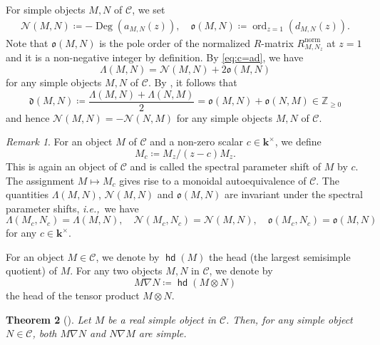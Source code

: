 \documentclass[12pt]{amsart}
\newtheorem{theorem}{Theorem}[section]
\theoremstyle{definition}
\theoremstyle{remark}
\newtheorem{remark}[theorem]{Remark}
\numberwithin{equation}{section}
\newcommand{\hd}{\opname{hd}}
\newcommand{\opname}[1]{\operatorname{\mathsf{#1}}}
\newcommand{\ie}{\textit{i.e.,}\ }
\begin{document}
For simple objects $M,N$ of $\mathscr{C}$, we set
\begin{eqnarray}\label{eqn:def-N}
    \mathscr{N}(M,N) \coloneqq -\mathop{\mathrm{Deg}}(a_{M,N}(z)), \quad 
\mathfrak{o}(M,N)\coloneqq \mathop{\mathrm{ord}}_{z=1}(d_{M,N}(z)).
\end{eqnarray}
Note that $\mathfrak{o}(M,N)$ is the pole order of the normalized $R$-matrix $R^{\mathrm{norm}}_{M,N_z}$ at $z=1$ and it is a non-negative integer by definition. By \eqref{eq:c=ad}, we have
\begin{equation} \label{eq:L=N+2o}
\Lambda(M,N) = \mathscr{N}(M,N) + 2 \mathfrak{o}(M,N)
\end{equation}
for any simple objects $M,N$ of $\mathscr{C}$. 
By \cite[Proposition 3.16]{kkop-2020}, it follows that
\[\mathfrak{d}(M,N) \coloneqq \frac{\Lambda(M,N) + \Lambda(N,M)}{2} = \mathfrak{o}(M,N)+\mathfrak{o}(N,M) \in \mathbb{Z}_{\ge 0}\]
and hence $\mathscr{N}(M,N) = - \mathscr{N}(N,M)$
for any simple objects $M,N$ of $\mathscr{C}$.

\begin{remark}\label{Rem:spec}
For an object $M$ of $\mathscr{C}$ and a non-zero scalar $c \in \mathbf{k}^\times$, we define 
\[ M_c \coloneqq M_z/(z-c)M_z.\]
This is again an object of $\mathscr{C}$ and is called the spectral parameter shift of $M$ by $c$.
The assignment $M \mapsto M_c$ gives rise to a monoidal autoequivalence of $\mathscr{C}$.
The quantities $\Lambda(M,N)$, $\mathscr{N}(M,N)$ and $\mathfrak{o}(M,N)$ are invariant under the spectral parameter shifts, \ie we have
\[ \Lambda(M_c,N_c) = \Lambda(M,N), \quad 
\mathscr{N}(M_c,N_c) = \mathscr{N}(M,N), \quad \mathfrak{o}(M_c,N_c) = \mathfrak{o}(M,N)\]
for any $c \in \mathbf{k}^\times$. 
\end{remark}




 For an object $M\in\mathscr{C}$, we denote by $\hd(M)$ the head (the largest semisimple quotient) of  $M$. For any two objects $M,N$ in $\mathscr{C}$, we denote by
\[M\nabla N \coloneqq  \hd(M\otimes N)
\]
 the head of the tensor product $M\otimes N$.
\begin{theorem}[{\cite{KKKO-2015}}]
\label{thm:kkko-15}
Let $M$ be a real simple object in $\mathscr{C}$. Then, for any simple object $N \in \mathscr{C}$, both $M \nabla N$ and $N \nabla M$ are simple.
\end{theorem}
\end{document}

